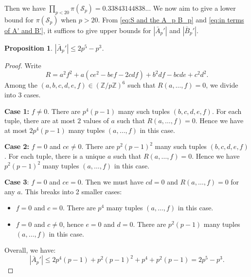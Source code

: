 \documentclass[12pt]{amsart}
\newtheorem{proposition}[theorem]{Proposition}
\newcommand{\Z}{\mathbb{Z}}
\numberwithin{equation}{section}
\begin{document}
Then we have $\displaystyle\prod_{p<20}\pi(\mathcal{S}_p)=0.33843144838...$ We now aim to give a lower bound for $\pi(\mathcal{S}_p)$ when $p>20$. From \eqref{eq:S and the A_p B_p} and \eqref{eq:in terms of A' and B'}, it suffices to give upper bounds for $|\bar{A}_p'|$
and $|\bar{B}_p'|$.
\begin{proposition}\label{prop:barAp'}
     $|\bar{A}_p'|\leq  2p^5-p^3$.
\end{proposition}
\begin{proof}
    Write
    $$R=a^2f^2+a(ce^2-bef-2cdf)+b^2df-bcde+c^2d^2.$$
    Among the $(a,b,c,d,e,f)\in (\Z/p\Z)^6$ such that $R(a,\ldots,f)=0$, we divide into $3$ cases.

    \textbf{Case 1:} $f\neq 0$. There are $p^4(p-1)$ many such tuples $(b,c,d,e,f)$. 
    For each tuple, there are at most $2$ values of $a$ such that $R(a,\ldots,f)=0$. Hence we have at most
    $2p^4(p-1)$ many tuples $(a,\ldots,f)$ in this case.

    \textbf{Case 2:} $f=0$ and $ce\neq 0$. There are $p^2(p-1)^2$ many such tuples $(b,c,d,e,f)$. For each tuple, there is a unique $a$ such that $R(a,\ldots,f)=0$. Hence we have 
    $p^2(p-1)^2$ many tuples $(a,\ldots,f)$ in this case.

    \textbf{Case 3}: $f=0$ and $ce=0$. Then we must have $cd=0$ and $R(a,\ldots,f)=0$ for any $a$. This breaks into 2 smaller cases:
    \begin{itemize}
        \item $f=0$ and $c=0$. There are $p^4$ many tuples $(a,\ldots,f)$ in this case.
        \item $f=0$ and $c\neq 0$, hence $e=0$ and $d=0$. There are $p^2(p-1)$ many tuples
        $(a,\ldots,f)$ in this case.
    \end{itemize}
    Overall, we have:
    $$|\bar{A}_p'|\leq 2p^4(p-1)+p^2(p-1)^2+p^4+p^2(p-1)=2p^5-p^3.$$
\end{proof}
\end{document}
